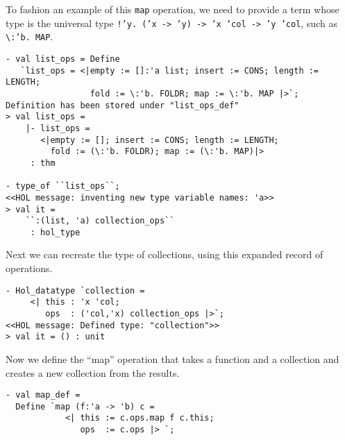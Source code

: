 To fashion an example of this \texttt{map} operation, we need to provide a term
whose type is the universal type \texttt{\small !'y.~('x -> 'y) -> 'x 'col -> 'y 'col},
such as \verb|\|\texttt{:'b.~MAP}.
\begin{session}
\begin{verbatim}
- val list_ops = Define
   `list_ops = <|empty := []:'a list; insert := CONS; length := LENGTH;
                 fold := \:'b. FOLDR; map := \:'b. MAP |>`;
Definition has been stored under "list_ops_def"
> val list_ops =
    |- list_ops =
       <|empty := []; insert := CONS; length := LENGTH;
         fold := (\:'b. FOLDR); map := (\:'b. MAP)|>
     : thm

- type_of ``list_ops``;
<<HOL message: inventing new type variable names: 'a>>
> val it =
    ``:(list, 'a) collection_ops``
     : hol_type
\end{verbatim}
\end{session}

Next we can recreate the type of collections, using this expanded record of operations.
\begin{session}
\begin{verbatim}
- Hol_datatype `collection =
     <| this : 'x 'col;
        ops  : ('col,'x) collection_ops |>`;
<<HOL message: Defined type: "collection">>
> val it = () : unit
\end{verbatim}
\end{session}

Now we define the ``map'' operation that takes a function
and a collection and creates a new collection from the results.
\begin{session}
\begin{verbatim}
- val map_def =
  Define `map (f:'a -> 'b) c =
            <| this := c.ops.map f c.this;
               ops  := c.ops |> `;
\end{verbatim}
\end{session}

